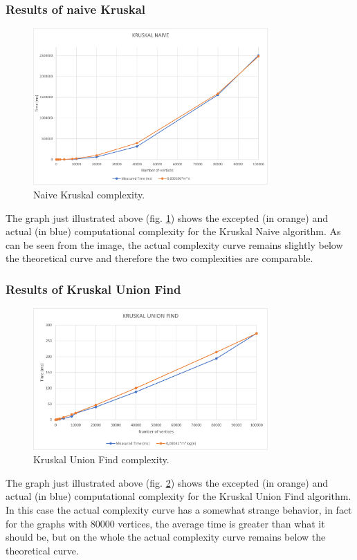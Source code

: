 \subsubsection{Results of naive Kruskal}
\begin{figure}[H]
    \centering
    \includegraphics[width=0.8\textwidth]{../img/KruskalNaive.png}
    \caption{Naive Kruskal complexity.}
    \label{fig:kruskal}
\end{figure}
The graph just illustrated above (fig. \ref{fig:kruskal}) shows the excepted (in orange) and actual (in blue) computational complexity for the Kruskal Naive algorithm. As can be seen from the image, the actual complexity curve remains slightly below the theoretical curve and therefore the two complexities are comparable.

\subsubsection{Results of Kruskal Union Find}
\begin{figure}[H]
    \centering
    \includegraphics[width=0.8\textwidth]{../img/KruskalUnionFind.png}
    \caption{Kruskal Union Find complexity.}
    \label{fig:kruskaluf}
\end{figure}
The graph just illustrated above (fig. \ref{fig:kruskaluf}) shows the excepted (in orange) and actual (in blue) computational complexity for the Kruskal Union Find algorithm. In this case the actual complexity curve has a somewhat strange behavior, in fact for the graphs with 80000 vertices, the average time is greater than what it should be, but on the whole the actual complexity curve remains below the theoretical curve.

